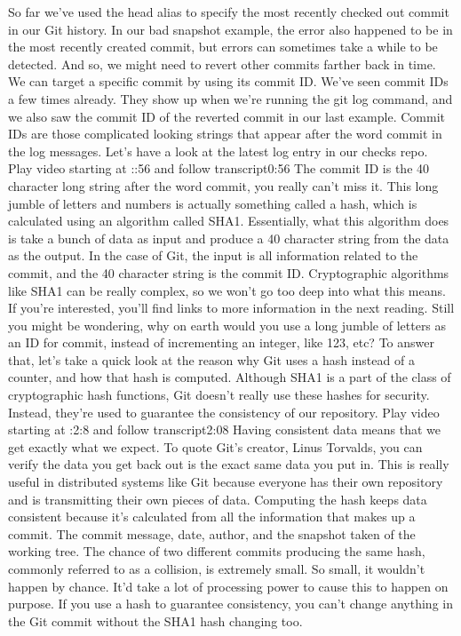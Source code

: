 	
	So far we've used the head alias to specify the most recently checked out commit in our Git history. In our bad snapshot example, the error also happened to be in the most recently created commit, but errors can sometimes take a while to be detected. And so, we might need to revert other commits farther back in time. We can target a specific commit by using its commit ID. We've seen commit IDs a few times already. They show up when we're running the git log command, and we also saw the commit ID of the reverted commit in our last example. Commit IDs are those complicated looking strings that appear after the word commit in the log messages. Let's have a look at the latest log entry in our checks repo.
	Play video starting at ::56 and follow transcript0:56
	The commit ID is the 40 character long string after the word commit, you really can't miss it. This long jumble of letters and numbers is actually something called a hash, which is calculated using an algorithm called SHA1. Essentially, what this algorithm does is take a bunch of data as input and produce a 40 character string from the data as the output. In the case of Git, the input is all information related to the commit, and the 40 character string is the commit ID. Cryptographic algorithms like SHA1 can be really complex, so we won't go too deep into what this means. If you're interested, you'll find links to more information in the next reading. Still you might be wondering, why on earth would you use a long jumble of letters as an ID for commit, instead of incrementing an integer, like 123, etc? To answer that, let's take a quick look at the reason why Git uses a hash instead of a counter, and how that hash is computed. Although SHA1 is a part of the class of cryptographic hash functions, Git doesn't really use these hashes for security. Instead, they're used to guarantee the consistency of our repository.
	Play video starting at :2:8 and follow transcript2:08
	Having consistent data means that we get exactly what we expect. To quote Git's creator, Linus Torvalds, you can verify the data you get back out is the exact same data you put in. This is really useful in distributed systems like Git because everyone has their own repository and is transmitting their own pieces of data. Computing the hash keeps data consistent because it's calculated from all the information that makes up a commit. The commit message, date, author, and the snapshot taken of the working tree. The chance of two different commits producing the same hash, commonly referred to as a collision, is extremely small. So small, it wouldn't happen by chance. It'd take a lot of processing power to cause this to happen on purpose. If you use a hash to guarantee consistency, you can't change anything in the Git commit without the SHA1 hash changing too.
